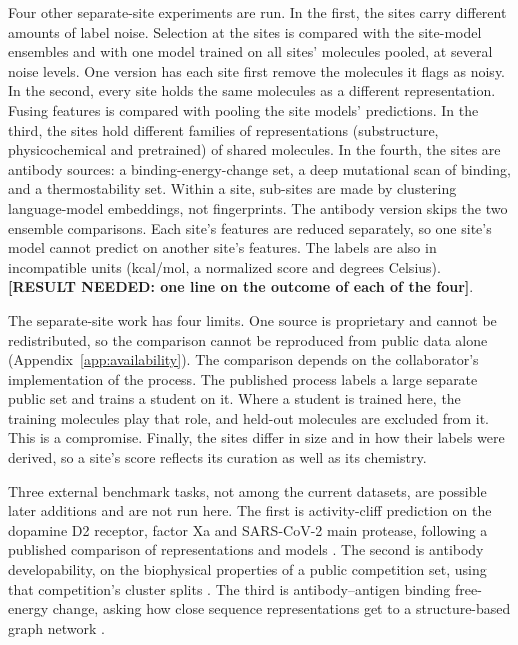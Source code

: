 Four other separate-site experiments are run. In the first, the sites carry different amounts of label noise. Selection at the sites is compared with the site-model ensembles and with one model trained on all sites' molecules pooled, at several noise levels. One version has each site first remove the molecules it flags as noisy. In the second, every site holds the same molecules as a different representation. Fusing features is compared with pooling the site models' predictions. In the third, the sites hold different families of representations (substructure, physicochemical and pretrained) of shared molecules. In the fourth, the sites are antibody sources: a binding-energy-change set, a deep mutational scan of binding, and a thermostability set. Within a site, sub-sites are made by clustering language-model embeddings, not fingerprints. The antibody version skips the two ensemble comparisons. Each site's features are reduced separately, so one site's model cannot predict on another site's features. The labels are also in incompatible units (kcal/mol, a normalized score and degrees Celsius). \textbf{[RESULT NEEDED: one line on the outcome of each of the four]}.

The separate-site work has four limits. One source is proprietary and cannot be redistributed, so the comparison cannot be reproduced from public data alone (Appendix~\ref{app:availability}). The comparison depends on the collaborator's implementation of the process. The published process labels a large separate public set and trains a student on it. Where a student is trained here, the training molecules play that role, and held-out molecules are excluded from it. This is a compromise. Finally, the sites differ in size and in how their labels were derived, so a site's score reflects its curation as well as its chemistry.

Three external benchmark tasks, not among the current datasets, are possible later additions and are not run here. The first is activity-cliff prediction on the dopamine D2 receptor, factor Xa and SARS-CoV-2 main protease, following a published comparison of representations and models \citep{Dablander2023}. The second is antibody developability, on the biophysical properties of a public competition set, using that competition's cluster splits \citep{vanNiekerk2026}. The third is antibody--antigen binding free-energy change, asking how close sequence representations get to a structure-based graph network \citep{Hummer2025}.


